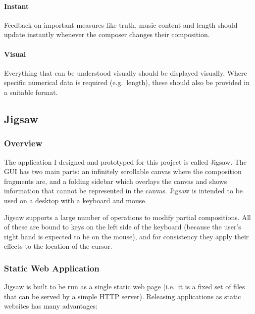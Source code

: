 \documentclass[12pt]{article}
\begin{document}
\paragraph{Instant} Feedback on important measures like truth, music content and length should
update instantly whenever the composer changes their composition.  

\paragraph{Visual} Everything that can be understood visually should be displayed visually.  Where
specific numerical data is required (e.g.\ length), these should also be provided in a suitable
format.

\subsection{Jigsaw}

\subsubsection{Overview}

The application I designed and prototyped for this project is called Jigsaw.  The GUI has two main
parts: an infinitely scrollable canvas where the composition fragments are, and a folding sidebar
which overlays the canvas and shows information that cannot be represented in the canvas.  Jigsaw is
intended to be used on a desktop with a keyboard and mouse.

Jigsaw supports a large number of operations to modify partial compositions.  All of these are bound
to keys on the left side of the keyboard (because the user's right hand is expected to be on the
mouse), and for consistency they apply their effects to the location of the cursor.

\subsubsection{Static Web Application}

Jigsaw is built to be run as a single static web page (i.e.\ it is a fixed set of files that can be
served by a simple HTTP server).  Releasing applications as static websites has many advantages:
\end{document}

